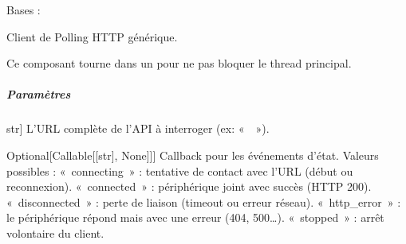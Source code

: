 \documentclass[letterpaper,10pt,french]{sphinxmanual}
\begin{document}
\begin{fulllineitems}
\label{\detokenize{api/hardware.transports:hardware.transports.wifi_client.WifiClient}}
\pysigstartsignatures
\pysiglinewithargsret
{}
{\sphinxparamcomma {}\sphinxparamcomma {}\sphinxparamcomma {}\sphinxparamcomma {}\sphinxparamcomma {}}
{}
\pysigstopsignatures
\sphinxAtStartPar
Bases : 

\sphinxAtStartPar
Client de Polling HTTP générique.

\sphinxAtStartPar
Ce composant tourne dans un  pour ne pas bloquer le thread principal.


\subparagraph{Paramètres}
\label{\detokenize{api/hardware.transports:id4}}\begin{description}
\sphinxlineitem{target\_url}{[}str{]}
\sphinxAtStartPar
L’URL complète de l’API à interroger (ex: «  »).

\sphinxlineitem{on\_status}{[}Optional{[}Callable{[}{[}str{]}, None{]}{]}{]}
\sphinxAtStartPar
Callback pour les événements d’état. Valeurs possibles :
\sphinxhyphen{} « connecting »     : tentative de contact avec l’URL (début ou reconnexion).
\sphinxhyphen{} « connected »      : périphérique joint avec succès (HTTP 200).
\sphinxhyphen{} « disconnected »   : perte de liaison (timeout ou erreur réseau).
\sphinxhyphen{} « http\_error »     : le périphérique répond mais avec une erreur (404, 500…).
\sphinxhyphen{} « stopped »        : arrêt volontaire du client.


\end{description}
\end{fulllineitems}
\end{document}
